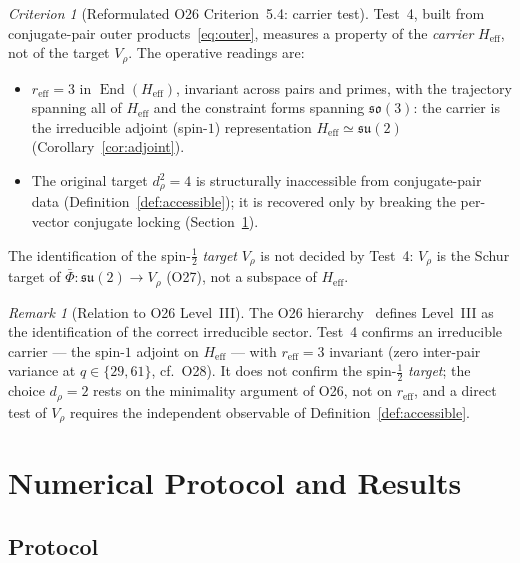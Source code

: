 \documentclass[12pt,a4paper]{article}
\theoremstyle{remark}
\newtheorem{remark}[theorem]{Remark}
\newtheorem{criterion}[theorem]{Criterion}
\DeclareMathOperator{\End}{End}
\newcommand{\su}{\mathfrak{su}}
\newcommand{\Heff}{H_{\mathrm{eff}}}
\newcommand{\Vrho}{V_{\rho}}
\newcommand{\reff}{r_{\mathrm{eff}}}
\begin{document}
    \begin{criterion}[Reformulated O26 Criterion~5.4: carrier test]
      \label{crit:reformulated}
      Test~4, built from conjugate-pair outer products~\eqref{eq:outer}, measures a property of the \emph{carrier}
      $\Heff$, not of the target $\Vrho$.
      The operative readings are:
      \begin{itemize}
        \item $\reff = 3$ in $\End(\Heff)$, invariant across pairs and primes, with the trajectory spanning all of
        $\Heff$ and the constraint forms spanning $\mathfrak{so}(3)$: the carrier is the irreducible adjoint
        (spin-$1$) representation $\Heff \simeq \su(2)$ (Corollary~\ref{cor:adjoint}).
        \item The original target $d_{\rho}^2 = 4$ is structurally inaccessible from conjugate-pair data
        (Definition~\ref{def:accessible}); it is recovered only by breaking the per-vector conjugate locking
        (Section~\ref{sec:results}).
      \end{itemize}
      The identification of the spin-$\tfrac{1}{2}$ \emph{target} $\Vrho$ is not decided by Test~4: $\Vrho$ is the
      Schur target of $\bar\Phi : \su(2) \to \Vrho$ (O27), not a subspace of $\Heff$.
    \end{criterion}

    \begin{remark}[Relation to O26 Level~III]
      \label{rem:level3}
      The O26 hierarchy~\cite{Beau2026a30} defines Level~III as the identification of the correct irreducible sector.
      Test~4 confirms an irreducible carrier --- the spin-$1$ adjoint on $\Heff$ --- with $\reff = 3$ invariant
      (zero inter-pair variance at $q \in \{29, 61\}$, cf.\ O28).
      It does not confirm the spin-$\tfrac{1}{2}$ \emph{target}; the choice $d_\rho = 2$ rests on the minimality
      argument of O26, not on $\reff$, and a direct test of $\Vrho$ requires the independent observable of
      Definition~\ref{def:accessible}.
    \end{remark}

  \section{Numerical Protocol and Results}
    \label{sec:results}

    \subsection{Protocol}
\end{document}
